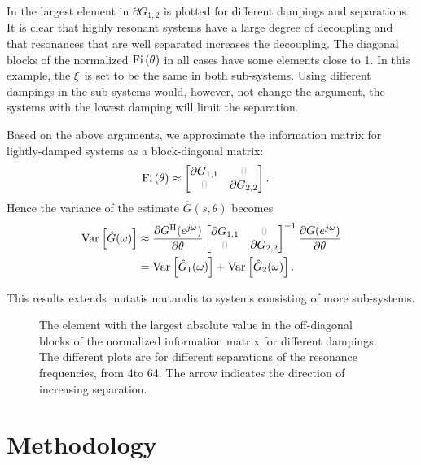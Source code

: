 In  the largest element in $\partial G_{1,2}$ is plotted for different dampings and separations. It is clear that highly resonant systems have a large degree of decoupling and that resonances that are well separated increases the decoupling. The diagonal blocks of the normalized $\mathrm{Fi} \left(\theta\right)$ in all cases have some elements close to 1. In this example, the $\xi$ is set to be the same in both sub-systems. Using different dampings in the sub-systems would, however, not change the argument, the systems with the lowest damping will limit the separation.

Based on the above arguments, we approximate the information matrix for lightly-damped systems as a block-diagonal matrix:
\begin{align}
\IF&\approx \begin{bmatrix}\partial G_{1,1} &\deemph{0}\\
                        \deemph{0}&\partial G_{2,2}\end{bmatrix}.
\end{align}
Hence the variance of the estimate $\hat{G}(s,\theta)$ becomes
\begin{align}
\var{\hat{G}(\omega)} &\approx \frac{\partial G^{\HT}(e^{j\omega})}{\partial \theta}\begin{bmatrix}\partial G_{1,1} &\deemph{0}\\
                        \deemph{0}&\partial G_{2,2}\end{bmatrix}^{-1}\frac{\partial G(e^{j\omega})}{\partial \theta}\\
&=\var{\hat{G}_1(\omega)} + \var{\hat{G}_2(\omega)}.
\end{align}

This results extends mutatis mutandis to systems consisting of more sub-systems.

\begin{figure}
\centering
\setlength{}
\setlength\figureheight{0.68\figurewidth}

\caption{The element with the largest absolute value in the off-diagonal blocks of the normalized information matrix for different dampings.
         The different plots are for different separations of the resonance frequencies, from 4\wdB to 64\wdB.
         The arrow indicates the direction of increasing separation.}
\label{fig:excitation:coupling}
\end{figure}

\section{Methodology} \label{sec:method}

